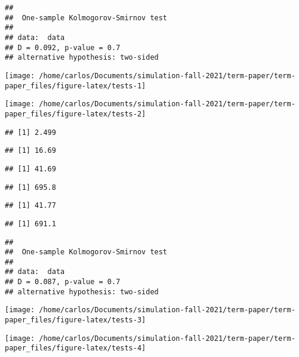 \documentclass[9pt,twocolumn,twoside,]{pnas-new}
\begin{document}
\begin{verbatim}
## 
##  One-sample Kolmogorov-Smirnov test
## 
## data:  data
## D = 0.092, p-value = 0.7
## alternative hypothesis: two-sided
\end{verbatim}

\begin{flushleft}\texttt{[image: /home/carlos/Documents/simulation-fall-2021/term-paper/term-paper\_files/figure-latex/tests-1]} \end{flushleft}

\begin{flushleft}\texttt{[image: /home/carlos/Documents/simulation-fall-2021/term-paper/term-paper\_files/figure-latex/tests-2]} \end{flushleft}

\begin{verbatim}
## [1] 2.499
\end{verbatim}

\begin{verbatim}
## [1] 16.69
\end{verbatim}

\begin{verbatim}
## [1] 41.69
\end{verbatim}

\begin{verbatim}
## [1] 695.8
\end{verbatim}

\begin{verbatim}
## [1] 41.77
\end{verbatim}

\begin{verbatim}
## [1] 691.1
\end{verbatim}

\begin{verbatim}
## 
##  One-sample Kolmogorov-Smirnov test
## 
## data:  data
## D = 0.087, p-value = 0.7
## alternative hypothesis: two-sided
\end{verbatim}

\begin{flushleft}\texttt{[image: /home/carlos/Documents/simulation-fall-2021/term-paper/term-paper\_files/figure-latex/tests-3]} \end{flushleft}

\begin{flushleft}\texttt{[image: /home/carlos/Documents/simulation-fall-2021/term-paper/term-paper\_files/figure-latex/tests-4]} \end{flushleft}
\end{document}
